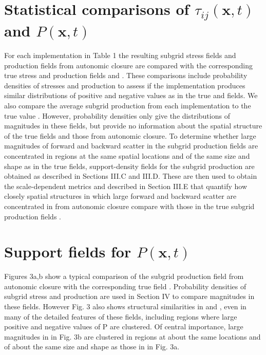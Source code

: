 \section{Statistical comparisons of $\tau_{ij}(\mathbf{x},t)$  and  $P(\mathbf{x},t)$ } 

For each implementation in Table 1 the resulting subgrid stress fields   and production fields   from autonomic closure are compared with the corresponding true stress and production fields   and  . These comparisons include probability densities of stresses and production to assess if the implementation produces similar distributions of positive and negative values as in the true   and   fields. We also compare the average subgrid production   from each implementation to the true value  . 
However, probability densities only give the distributions of magnitudes in these fields, but provide no information about the spatial structure of the true fields and those from autonomic closure. To determine whether large magnitudes of forward and backward scatter in the subgrid production fields   are concentrated in regions at the same spatial locations and of the same size and shape as in the true   fields, support-density fields for the subgrid production are obtained as described in Sections III.C and III.D. These are then used to obtain the scale-dependent metrics   and   described in Section III.E that quantify how closely spatial structures in which large forward and backward scatter are concentrated in   from autonomic closure compare with those in the true subgrid production fields  .


\section{Support fields for $P(\mathbf{x},t)$} 

Figures 3a,b show a typical comparison of the subgrid production field   from autonomic closure with the corresponding true field  . Probability densities of subgrid stress and production are used in Section IV to compare magnitudes in these fields. However Fig. 3 also shows structural similarities in   and  , even in many of the detailed features of these fields, including regions where large positive and negative values of P are clustered. Of central importance, large magnitudes in   in Fig. 3b are clustered in regions at about the same locations and of about the same size and shape as those in   in Fig. 3a. 

